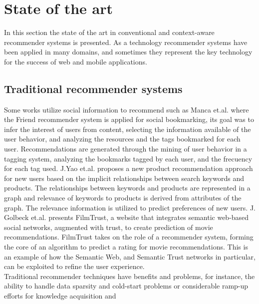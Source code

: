 \chapter{State of the art} \label{stateoftheart}

In this section the state of the art in conventional and
context-aware recommender systems is presented. 
As a technology recommender systems have been applied 
in many domains, and sometimes they represent the  key
technology for the success of web and mobile applications.

\section{Traditional recommender systems} 
Some works utilize social information to recommend such
as Manca et.al. \cite{manca2014mining} where the Friend recommender
system is applied for social bookmarking, its goal was to
infer the interest of users from content, selecting the 
information available of the user behavior, and analyzing the resources and the
tags bookmarked for each user. Recommendations are generated
through the mining of user behavior in a tagging system, analyzing the
bookmarks tagged by each user, and the frecuency for each tag used. 
J.Yao et.al. \cite{yao2012product} proposes a new product recommendation
approach for new users based on the implicit relationships between
search keywords and products. The relationships between keywords and
products are represented in a graph and relevance of keywords to
products is derived from attributes of the graph.
The relevance
information is utilized to predict preferences of new users. J.
Golbeck et.al. \cite{golbeck2006filmtrust} presents FilmTrust, a
website that integrates semantic web-based social networks, augmented
with trust, to create prediction of movie recommendations. FilmTrust takes on
the role of a recommender system, forming the core of an algorithm to
predict a rating for movie recommendations. This is an example of
how the Semantic Web, and Semantic Trust networks in particular, can
be exploited to refine the user experience. \\  
Traditional recommender techniques have benefits and problems, for
instance, the ability to handle data sparsity and cold-start problems
or considerable ramp-up efforts for knowledge acquisition and
